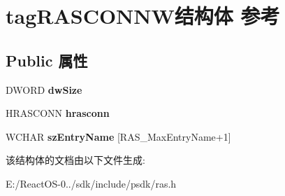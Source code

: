 \hypertarget{structtag_r_a_s_c_o_n_n_w}{}\section{tag\+R\+A\+S\+C\+O\+N\+N\+W结构体 参考}
\label{structtag_r_a_s_c_o_n_n_w}
\subsection*{Public 属性}
\begin{DoxyCompactItemize}
\item 
\mbox{\label{structtag_r_a_s_c_o_n_n_w_ae5676531ca3d9dbe2d4b00e4e440ca15}} 
D\+W\+O\+RD {\bfseries dw\+Size}
\item 
\mbox{\label{structtag_r_a_s_c_o_n_n_w_aa7f14689f15746dd195edbd1e5730ab5}} 
H\+R\+A\+S\+C\+O\+NN {\bfseries hrasconn}
\item 
\mbox{\label{structtag_r_a_s_c_o_n_n_w_a65bc5d4612e086f811edf5e3f47d2a7d}} 
W\+C\+H\+AR {\bfseries sz\+Entry\+Name} \mbox{[}R\+A\+S\+\_\+\+Max\+Entry\+Name+1\mbox{]}
\end{DoxyCompactItemize}


该结构体的文档由以下文件生成\+:\begin{DoxyCompactItemize}
\item 
E\+:/\+React\+O\+S-\/0../sdk/include/psdk/ras.\+h\end{DoxyCompactItemize}
